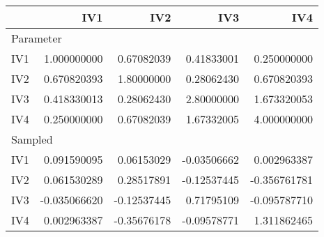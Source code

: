 \begin{longtable}{l|rrrr}
\toprule
\multicolumn{1}{l}{} & IV1 & IV2 & IV3 & IV4 \\ 
\midrule
\multicolumn{5}{l}{Parameter} \\ 
\midrule
IV1 & 1.000000000 & 0.67082039 & 0.41833001 & 0.250000000 \\ 
IV2 & 0.670820393 & 1.80000000 & 0.28062430 & 0.670820393 \\ 
IV3 & 0.418330013 & 0.28062430 & 2.80000000 & 1.673320053 \\ 
IV4 & 0.250000000 & 0.67082039 & 1.67332005 & 4.000000000 \\ 
\midrule
\multicolumn{5}{l}{Sampled} \\ 
\midrule
IV1 & 0.091590095 & 0.06153029 & -0.03506662 & 0.002963387 \\ 
IV2 & 0.061530289 & 0.28517891 & -0.12537445 & -0.356761781 \\ 
IV3 & -0.035066620 & -0.12537445 & 0.71795109 & -0.095787710 \\ 
IV4 & 0.002963387 & -0.35676178 & -0.09578771 & 1.311862465 \\ 
\bottomrule
\end{longtable}

